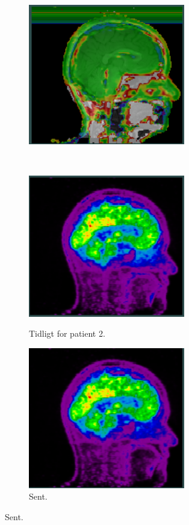 \begin{figure}
\begin{subfigure}[b]{0.3\textwidth}
        \includegraphics[width=0.75\textwidth]{colager/over_tid_pet/over_tid_121280_pd.png}
        \label{col:over_time_pet_pat1_pd}
    \end{subfigure}\\
    \begin{subfigure}[b]{0.3\textwidth}
        \caption{Tidligt for patient 2.}
        \includegraphics[width=0.75\textwidth]{colager/over_tid_pet/over_tid_140547_early.png}
        \label{col:over_time_pet_pat2_early}
    \end{subfigure}\hfill
    \begin{subfigure}[b]{0.3\textwidth}
        \caption{Sent.}
        \includegraphics[width=0.75\textwidth]{colager/over_tid_pet/over_tid_140547_late.png}

\end{subfigure}
\end{figure}

